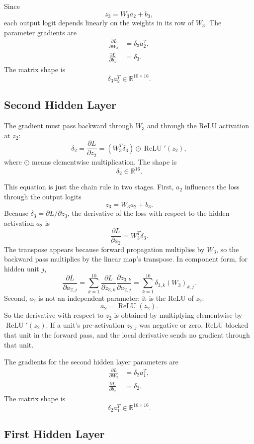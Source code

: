 \documentclass[11pt]{article}
\newcommand{\R}{\mathbb{R}}
\newcommand{\relu}{\operatorname{ReLU}}
\begin{document}
Since
\[
    z_3 = W_3 a_2 + b_3,
\]
each output logit depends linearly on the weights in its row of $W_3$. The
parameter gradients are
\[
\begin{aligned}
    \frac{\partial L}{\partial W_3} &= \delta_3 a_2^T, \\
    \frac{\partial L}{\partial b_3} &= \delta_3.
\end{aligned}
\]
The matrix shape is
\[
    \delta_3 a_2^T \in \R^{10 \times 16}.
\]

\subsection{Second Hidden Layer}

The gradient must pass backward through $W_3$ and through the ReLU activation at
$z_2$:
\[
    \delta_2
    = \frac{\partial L}{\partial z_2}
    = (W_3^T \delta_3) \odot \relu'(z_2),
\]
where $\odot$ means elementwise multiplication. The shape is
\[
    \delta_2 \in \R^{16}.
\]

This equation is just the chain rule in two stages. First, $a_2$ influences the
loss through the output logits
\[
    z_3 = W_3 a_2 + b_3.
\]
Because $\delta_3 = \partial L / \partial z_3$, the derivative of the loss with
respect to the hidden activation $a_2$ is
\[
    \frac{\partial L}{\partial a_2} = W_3^T \delta_3.
\]
The transpose appears because forward propagation multiplies by $W_3$, so the
backward pass multiplies by the linear map's transpose. In component form, for
hidden unit $j$,
\[
    \frac{\partial L}{\partial a_{2,j}}
    = \sum_{k=1}^{10} \frac{\partial L}{\partial z_{3,k}}
      \frac{\partial z_{3,k}}{\partial a_{2,j}}
    = \sum_{k=1}^{10} \delta_{3,k} (W_3)_{k,j}.
\]
Second, $a_2$ is not an independent parameter; it is the ReLU of $z_2$:
\[
    a_2 = \relu(z_2).
\]
So the derivative with respect to $z_2$ is obtained by multiplying elementwise by
$\relu'(z_2)$. If a unit's pre-activation $z_{2,j}$ was negative or zero, ReLU
blocked that unit in the forward pass, and the local derivative sends no gradient
through that unit.

The gradients for the second hidden layer parameters are
\[
\begin{aligned}
    \frac{\partial L}{\partial W_2} &= \delta_2 a_1^T, \\
    \frac{\partial L}{\partial b_2} &= \delta_2.
\end{aligned}
\]
The matrix shape is
\[
    \delta_2 a_1^T \in \R^{16 \times 16}.
\]

\subsection{First Hidden Layer}
\end{document}
